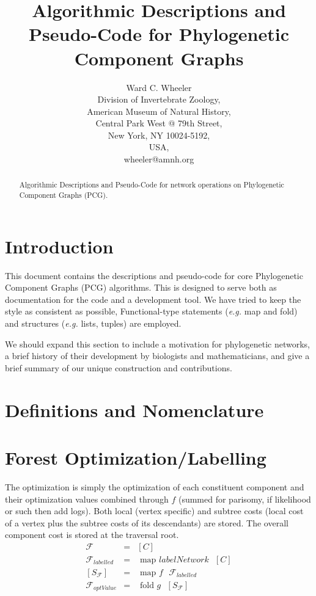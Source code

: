 \documentclass[11pt]{article}
\title{Algorithmic Descriptions and Pseudo-Code for Phylogenetic Component Graphs}
\author{Ward C. Wheeler\\
		Division of Invertebrate Zoology,\\
		American Museum of Natural History,\\
		Central Park West @ 79th Street,\\
		New York, NY 10024-5192,\\
		USA,\\
		wheeler@amnh.org}
\begin{document}
\maketitle
\begin{abstract}
	Algorithmic Descriptions and Pseudo-Code for network operations on Phylogenetic Component Graphs (PCG).
\end{abstract}
\tableofcontents

\section{Introduction} \label{Introduction}
This document contains the descriptions and pseudo-code for core  Phylogenetic Component Graphs (PCG) algorithms.  
This is designed to serve both as documentation for the code and a development tool. 
We have tried to keep the style as consistent as possible, Functional-type statements (\textit{e.g.} map and fold) and structures (\textit{e.g.} lists, tuples) are employed.

We should expand this section to include a motivation for phylogenetic networks, a brief history of their development by biologists and mathematicians, and give a brief summary of our unique construction and contributions.

\section{Definitions and Nomenclature}
 
\section{Forest Optimization/Labelling}\label{Forest Optimization/Labelling}

The optimization is simply the optimization of each constituent component and their optimization values combined through $f$ (summed for parisomy, if likelihood or such then add logs). 
Both local (vertex  specific) and subtree costs (local cost of a vertex plus the subtree costs of its descendants) are stored.
The overall component cost is stored at the traversal root.
     \begin{eqnarray*}
     	\mathcal{F} & = & [C]\\
	\mathcal{F}_{labelled} & = & \text{ map } labelNetwork \text{ } [C]\\
	\left[ S_{\mathcal{F}} \right] &=& \text{ map } f \text{ } \mathcal{F}_{labelled}\\
	\mathcal{F}_{optValue} &=& \text{ fold } g \text{ } \left[ S_{\mathcal{F}} \right] 
    \end{eqnarray*}
 
\end{document}

